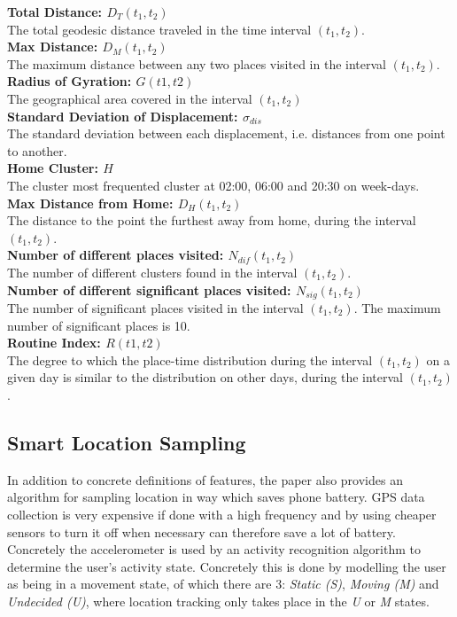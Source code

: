 \textbf{Total Distance: $D_T (t_1, t_2)$}\\
The total geodesic distance traveled in the time interval $(t_1, t_2)$.\\

\textbf{Max Distance: $D_M (t_1, t_2)$}\\
The maximum distance between any two places visited in the interval $(t_1, t_2)$.\\

\textbf{Radius of Gyration: $G(t1, t2)$}\\
The geographical area covered in the interval $(t_1, t_2)$\\

\textbf{Standard Deviation of Displacement: $\sigma_{dis}$}\\
The standard deviation between each displacement, i.e. distances from one point to another.\\

\textbf{Home Cluster: $H$}\\
The cluster most frequented cluster at 02:00, 06:00 and 20:30 on week-days.\\

\textbf{Max Distance from Home: $D_H(t_1, t_2)$}\\
The distance to the point the furthest away from home, during the interval $(t_1, t_2)$.\\

\textbf{Number of different places visited: $N_{dif} (t_1, t_2)$}\\
The number of different clusters found in the interval $(t_1, t_2)$.\\

\textbf{Number of different significant places visited: $N_{sig} (t_1, t_2)$}\\
The number of significant places visited in the interval $(t_1, t_2)$. The maximum number of significant places is 10.\\

\textbf{Routine Index: $R(t1, t2)$}\\
The degree to which the place-time distribution during the interval $(t_1, t_2)$ on a given day is similar to the distribution on other days, during the interval $(t_1, t_2)$.\\

\subsection{Smart Location Sampling}
In addition to concrete definitions of features, the paper also provides an algorithm for sampling location in way which saves phone battery. GPS data collection is very expensive if done with a high frequency and by using cheaper sensors to turn it off when necessary can therefore save a lot of battery. Concretely the accelerometer is used by an activity recognition algorithm to determine the user's activity state. Concretely this is done by modelling the user as being in a movement state, of which there are 3: \textit{Static (S)}, \textit{Moving (M)} and \textit{Undecided (U)}, where location tracking only takes place in the \textit{U} or \textit{M} states. \\

